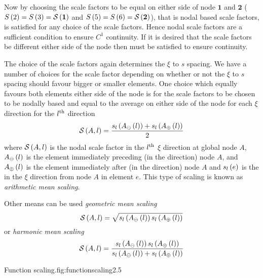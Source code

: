 Now by choosing the scale factors to be equal on either side of node
$\mathbf{1}$ and $\mathbf{2}$ (\ie $   S \left( {2} \right)  =   S \left( {3} \right)  =   \mathcal{S} \left( \mathbf{1} \right)  $
and $   S \left( {5} \right)  =   S \left( {6} \right)  =   \mathcal{S} \left( \mathbf{2} \right)  $), that is nodal based scale
factors,  is satisfied for any choice of the scale
factors.  Hence nodal scale factors are a sufficient condition to ensure
$C^{1}$ continuity. If it is desired that the scale factors be different
either side of the node then  must be satisfied to
ensure continuity.

The choice of the scale factors again determines the $\xi$
to $s$ spacing. We have a number of choices for the scale factor depending on
whether or not the $\xi$ to $s$ spacing should favour bigger or smaller
elements. One choice which equally favours both elements either side of the
node is for the scale factors to be chosen to be nodally based and equal to the average \arclen on either side
of the node for each $\xi$ direction \ie for the ${l}^{\text{th}}$ direction
\begin{equation}
  \nsftwo{A}{l}=\dfrac{\fnof{s_{l}}{\fnof{A_{\ominus}}{l}}+
    \fnof{s_{l}}{\fnof{A_{\oplus}}{l}}}{2}
  \label{eqn:arithmeanarclenscale}
\end{equation}
where $   \mathcal{S} \left( A,l \right)  $ is the nodal scale factor in the ${l}^{\text{th}}$ $\xi$
direction at global node $A$, $ A_{\ominus}\left( l \right) $ is the element
immediately preceding (in the  direction) node $A$, and
$ A_{\oplus}\left( l \right) $ is the element immediately after (in the 
direction) node $A$ and $ s_{l}\left( e \right) $ is the \arclen in the  $\xi$
direction from node $A$ in element $e$. This type of scaling is known as
\emph{arithmetic mean \arclen scaling}.

Other means can be used \ie \emph{geometric mean \arclen scaling}
\begin{equation}
  \nsftwo{A}{l}=\sqrt{\fnof{s_{l}}{\fnof{A_{\ominus}}{l}}
    \fnof{s_{l}}{\fnof{A_{\oplus}}{l}}}
  \label{eqn:geomeanarclenscale}
\end{equation}
or \emph{harmonic mean \arclen scaling}
\begin{equation}
  \nsftwo{A}{l}=\dfrac{\fnof{s_{l}}{\fnof{A_{\ominus}}{l}}
    \fnof{s_{l}}{\fnof{A_{\oplus}}{l}}}{\fnof{s_{l}}{\fnof{A_{\ominus}}{l}}+
    \fnof{s_{l}}{\fnof{A_{\oplus}}{l}}}
  \label{eqn:harmonicmeanarclenscale}
\end{equation}



{Function scaling.}{fig:functionscaling}{2.5}

